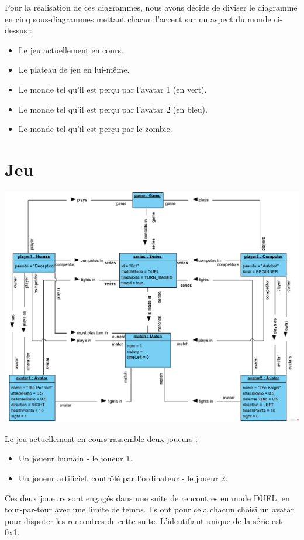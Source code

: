 \documentclass[oneside,a4paper]{book}
\begin{document}
Pour la réalisation de ces diagrammes, nous avons décidé de diviser le diagramme en cinq sous-diagrammes mettant chacun l'accent sur un aspect du monde ci-dessus :
\begin{itemize}
    \item Le jeu actuellement en cours.
    \item Le plateau de jeu en lui-même.
    \item Le monde tel qu'il est perçu par l'avatar 1 (en vert).
    \item Le monde tel qu'il est perçu par l'avatar 2 (en bleu).
    \item Le monde tel qu'il est perçu par le zombie.
\end{itemize}

\section{Jeu}
\includegraphics[width=\textwidth,height=\textheight,keepaspectratio]{Diagrams/OD-Game.png}\newline

Le jeu actuellement en cours rassemble deux joueurs :
\begin{itemize}
    \item Un joueur humain - le joueur 1.
    \item Un joueur artificiel, contrôlé par l'ordinateur - le joueur 2.
\end{itemize}

Ces deux joueurs sont engagés dans une suite de rencontres en mode DUEL, en tour-par-tour avec une limite de temps. Ils ont pour cela chacun choisi un avatar pour disputer les rencontres de cette suite. L'identifiant unique de la série est 0x1.\newline
\end{document}
